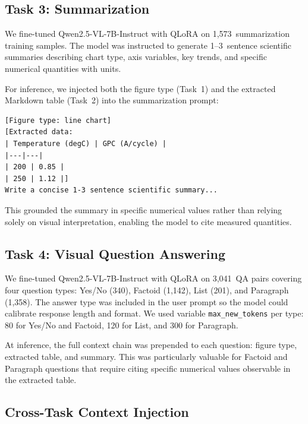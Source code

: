 \documentclass[11pt]{tibop-article}
\begin{document}
\subsection{Task 3: Summarization}

We fine-tuned Qwen2.5-VL-7B-Instruct with QLoRA on 1,573~summarization
training samples.
The model was instructed to generate 1--3~sentence scientific summaries
describing chart type, axis variables, key trends, and specific numerical
quantities with units.

For inference, we injected both the figure type (Task~1) and the extracted
Markdown table (Task~2) into the summarization prompt:
\begin{verbatim}
[Figure type: line chart]
[Extracted data:
| Temperature (degC) | GPC (A/cycle) |
|---|---|
| 200 | 0.85 |
| 250 | 1.12 |]
Write a concise 1-3 sentence scientific summary...
\end{verbatim}
This grounded the summary in specific numerical values rather than relying
solely on visual interpretation, enabling the model to cite measured quantities.

\subsection{Task 4: Visual Question Answering}

We fine-tuned Qwen2.5-VL-7B-Instruct with QLoRA on 3,041~QA pairs covering
four question types: Yes/No (340), Factoid (1,142), List (201), and
Paragraph (1,358).
The answer type was included in the user prompt so the model could calibrate
response length and format.
We used variable \texttt{max\_new\_tokens} per type: 80 for Yes/No and Factoid,
120 for List, and 300 for Paragraph.

At inference, the full context chain was prepended to each question:
figure type, extracted table, and summary.
This was particularly valuable for Factoid and Paragraph questions that require
citing specific numerical values observable in the extracted table.

\subsection{Cross-Task Context Injection}
\label{sec:context}
\end{document}
